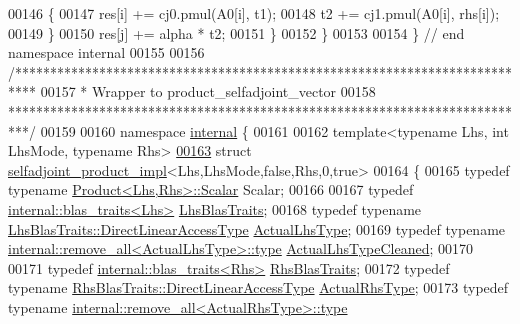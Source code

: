 \begin{DoxyCode}
00146     \{
00147       res[i] += cj0.pmul(A0[i], t1);
00148       t2 += cj1.pmul(A0[i], rhs[i]);
00149     \}
00150     res[j] += alpha * t2;
00151   \}
00152 \}
00153 
00154 \} \textcolor{comment}{// end namespace internal }
00155 
00156 \textcolor{comment}{/***************************************************************************}
00157 \textcolor{comment}{* Wrapper to product\_selfadjoint\_vector}
00158 \textcolor{comment}{***************************************************************************/}
00159 
00160 \textcolor{keyword}{namespace }\hyperlink{namespaceinternal}{internal} \{
00161 
00162 \textcolor{keyword}{template}<\textcolor{keyword}{typename} Lhs, \textcolor{keywordtype}{int} LhsMode, \textcolor{keyword}{typename} Rhs>
\hyperlink{struct_eigen_1_1internal_1_1selfadjoint__product__impl_3_01_lhs_00_01_lhs_mode_00_01false_00_01_rhs_00_010_00_01true_01_4}{00163} \textcolor{keyword}{struct }\hyperlink{struct_eigen_1_1internal_1_1selfadjoint__product__impl}{selfadjoint\_product\_impl}<Lhs,LhsMode,false,Rhs,0,true>
00164 \{
00165   \textcolor{keyword}{typedef} \textcolor{keyword}{typename} \hyperlink{group___core___module_class_eigen_1_1_product}{Product<Lhs,Rhs>::Scalar} Scalar;
00166   
00167   \textcolor{keyword}{typedef} \hyperlink{struct_eigen_1_1internal_1_1blas__traits}{internal::blas\_traits<Lhs>} \hyperlink{struct_eigen_1_1internal_1_1blas__traits}{LhsBlasTraits};
00168   \textcolor{keyword}{typedef} \textcolor{keyword}{typename} \hyperlink{class_eigen_1_1internal_1_1_tensor_lazy_evaluator_writable}{LhsBlasTraits::DirectLinearAccessType} 
      \hyperlink{class_eigen_1_1internal_1_1_tensor_lazy_evaluator_writable}{ActualLhsType};
00169   \textcolor{keyword}{typedef} \textcolor{keyword}{typename} \hyperlink{group___sparse_core___module}{internal::remove\_all<ActualLhsType>::type} 
      \hyperlink{group___sparse_core___module}{ActualLhsTypeCleaned};
00170   
00171   \textcolor{keyword}{typedef} \hyperlink{struct_eigen_1_1internal_1_1blas__traits}{internal::blas\_traits<Rhs>} \hyperlink{struct_eigen_1_1internal_1_1blas__traits}{RhsBlasTraits};
00172   \textcolor{keyword}{typedef} \textcolor{keyword}{typename} \hyperlink{class_eigen_1_1internal_1_1_tensor_lazy_evaluator_writable}{RhsBlasTraits::DirectLinearAccessType} 
      \hyperlink{class_eigen_1_1internal_1_1_tensor_lazy_evaluator_writable}{ActualRhsType};
00173   \textcolor{keyword}{typedef} \textcolor{keyword}{typename} \hyperlink{group___sparse_core___module}{internal::remove\_all<ActualRhsType>::type} 

\end{DoxyCode}

